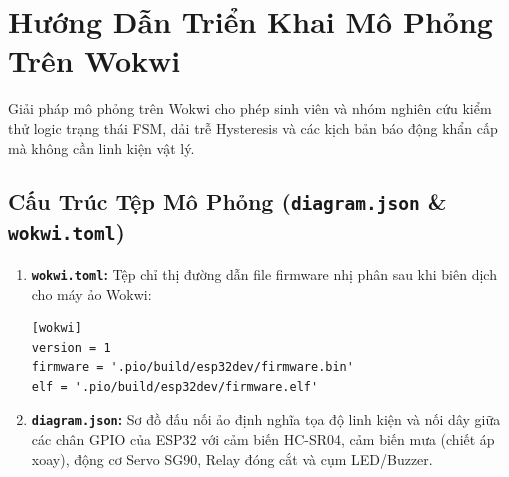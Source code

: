 \section{Hướng Dẫn Triển Khai Mô Phỏng Trên Wokwi}

Giải pháp mô phỏng trên Wokwi cho phép sinh viên và nhóm nghiên cứu kiểm thử logic trạng thái FSM, dải trễ Hysteresis và các kịch bản báo động khẩn cấp mà không cần linh kiện vật lý.

\subsection{Cấu Trúc Tệp Mô Phỏng (\texttt{diagram.json} \& \texttt{wokwi.toml})}
\begin{enumerate}
    \item \textbf{\texttt{wokwi.toml}:} Tệp chỉ thị đường dẫn file firmware nhị phân sau khi biên dịch cho máy ảo Wokwi:
    \begin{lstlisting}[caption={Nội dung tệp cấu hình wokwi.toml}]
[wokwi]
version = 1
firmware = '.pio/build/esp32dev/firmware.bin'
elf = '.pio/build/esp32dev/firmware.elf'
    \end{lstlisting}
    \item \textbf{\texttt{diagram.json}:} Sơ đồ đấu nối ảo định nghĩa tọa độ linh kiện và nối dây giữa các chân GPIO của ESP32 với cảm biến HC-SR04, cảm biến mưa (chiết áp xoay), động cơ Servo SG90, Relay đóng cắt và cụm LED/Buzzer.
\end{enumerate}

